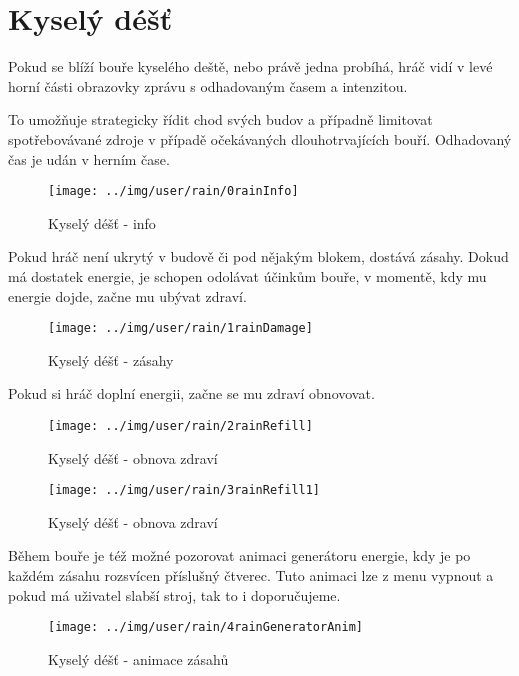 
\section{Kyselý déšť}

Pokud se blíží bouře kyselého deště, nebo právě jedna probíhá, hráč vidí v levé horní části obrazovky zprávu s odhadovaným časem a intenzitou.

To umožňuje strategicky řídit chod svých budov a případně limitovat spotřebovávané zdroje v případě očekávaných dlouhotrvajících bouří. Odhadovaný čas je udán v herním čase.

\begin{figure}[!h]\centering
\texttt{[image: ../img/user/rain/0rainInfo]}

\caption{Kyselý déšť - info}
\label{fig:user_rain_0rainInfo}

\end{figure}

\FloatBarrier

Pokud hráč není ukrytý v budově či pod nějakým blokem, dostává zásahy. Dokud má dostatek energie, je schopen odolávat účinkům bouře, v momentě, kdy mu energie dojde, začne mu ubývat zdraví.


\begin{figure}[!h]\centering
\texttt{[image: ../img/user/rain/1rainDamage]}

\caption{Kyselý déšť - zásahy}
\label{fig:user_rain_1rainDamage}

\end{figure}

\FloatBarrier

Pokud si hráč doplní energii, začne se mu zdraví obnovovat.

\begin{figure}[!h]\centering
\texttt{[image: ../img/user/rain/2rainRefill]}

\caption{Kyselý déšť - obnova zdraví}
\label{fig:user_rain_2rainRefill}

\end{figure}


\begin{figure}[!h]\centering
\texttt{[image: ../img/user/rain/3rainRefill1]}

\caption{Kyselý déšť - obnova zdraví}
\label{fig:user_rain_3rainRefill1}

\end{figure}

\FloatBarrier

Během bouře je též možné pozorovat animaci generátoru energie, kdy je po každém zásahu rozsvícen příslušný čtverec. Tuto animaci lze z menu vypnout a pokud má uživatel slabší stroj, tak to i doporučujeme.

\begin{figure}[!h]\centering
\texttt{[image: ../img/user/rain/4rainGeneratorAnim]}

\caption{Kyselý déšť - animace zásahů}
\label{fig:user_rain_4rainGeneratorAnim}

\end{figure}


\FloatBarrier
